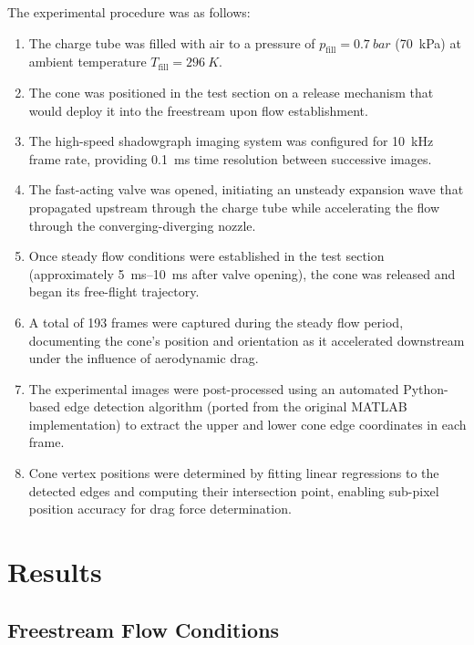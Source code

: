 The experimental procedure was as follows:
\begin{enumerate}
    \item The charge tube was filled with air to a pressure of $p_{\text{fill}} = \qty{0.7}{bar}$ (\qty{70}{kPa}) at ambient temperature $T_{\text{fill}} = \qty{296}{K}$.

    \item The cone was positioned in the test section on a release mechanism that would deploy it into the freestream upon flow establishment.

    \item The high-speed shadowgraph imaging system was configured for \qty{10}{kHz} frame rate, providing \qty{0.1}{ms} time resolution between successive images.

    \item The fast-acting valve was opened, initiating an unsteady expansion wave that propagated upstream through the charge tube while accelerating the flow through the converging-diverging nozzle.

    \item Once steady flow conditions were established in the test section (approximately \qtyrange{5}{10}{ms} after valve opening), the cone was released and began its free-flight trajectory.

    \item A total of \num{193} frames were captured during the steady flow period, documenting the cone's position and orientation as it accelerated downstream under the influence of aerodynamic drag.

    \item The experimental images were post-processed using an automated Python-based edge detection algorithm (ported from the original MATLAB implementation) to extract the upper and lower cone edge coordinates in each frame.

    \item Cone vertex positions were determined by fitting linear regressions to the detected edges and computing their intersection point, enabling sub-pixel position accuracy for drag force determination.
\end{enumerate}

\section{Results} \label{sec:results}

\subsection{Freestream Flow Conditions} \label{sec:results/freestream}


